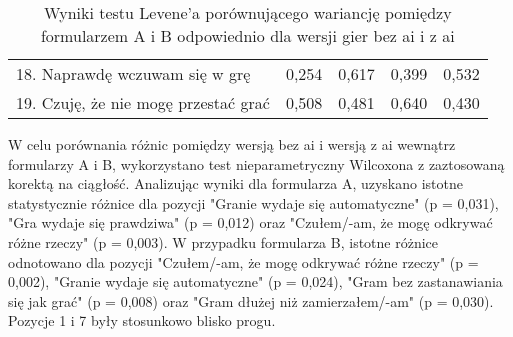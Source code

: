 \begin{table}[!h]
\begin{center}
\begin{tabular}{|m{10em}|m{5em}|m{5em}|m{5em}|m{5em}|}
            18. Naprawdę wczuwam się w grę                                    & 0,254                             & 0,617                  & 0,399                         & 0,532              \\
            19. Czuję, że nie mogę przestać grać                              & 0,508                             & 0,481                  & 0,640                         & 0,430              \\
            \hline
        \end{tabular}
    \end{center}
    \caption{Wyniki testu Levene'a porównującego wariancję pomiędzy formularzem A i B odpowiednio dla wersji gier bez \gls{ai} i z \gls{ai}}\label{tab1:ch7_12}
\end{table}

\clearpage

W celu porównania różnic pomiędzy wersją bez \gls{ai} i wersją z \gls{ai} wewnątrz formularzy A i B, wykorzystano test
nieparametryczny Wilcoxona z zaztosowaną korektą na ciągłość. Analizując wyniki dla formularza A, uzyskano istotne statystycznie różnice dla
pozycji "Granie wydaje się automatyczne" (p = 0,031), "Gra wydaje się prawdziwa" (p = 0,012) oraz "Czułem/-am, że
mogę odkrywać różne rzeczy" (p = 0,003). W przypadku formularza B, istotne różnice odnotowano dla pozycji
"Czułem/-am, że mogę odkrywać różne rzeczy" (p = 0,002), "Granie wydaje się automatyczne" (p = 0,024),
"Gram bez zastanawiania się jak grać" (p = 0,008) oraz "Gram dłużej niż zamierzałem/-am" (p = 0,030). Pozycje 1 i 7
były stosunkowo blisko progu.

